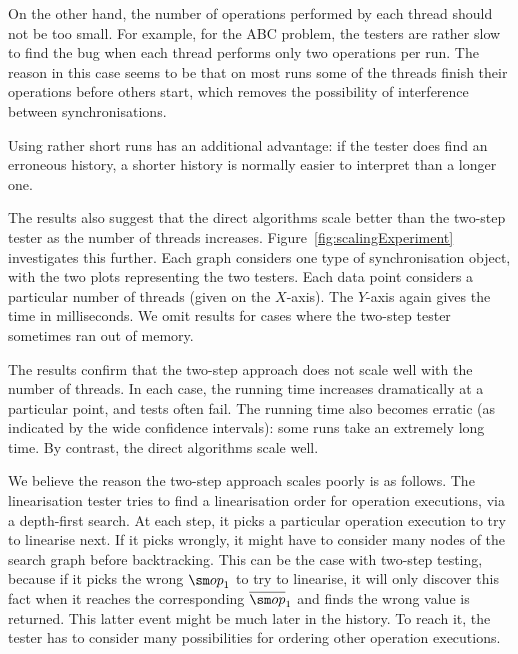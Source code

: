 On the other hand, the number of operations performed by each thread should
not be too small.  For example, for the ABC problem, the testers are rather
slow to find the bug when each thread performs only two operations per run.
The reason in this case seems to be that on most runs some of the threads
finish their operations before others start, which removes the possibility of
interference between synchronisations.

Using rather short runs has an additional advantage: if the tester does find
an erroneous history, a shorter history is normally easier to interpret than a
longer one.  



The results also suggest that the direct algorithms scale better than the
two-step tester as the number of threads increases.
Figure~\ref{fig:scalingExperiment} investigates this further.  Each graph
considers one type of synchronisation object, with the two plots representing
the two testers.  Each data point considers a particular number of threads
(given on the $X$-axis).
The $Y$-axis again gives the time in milliseconds.  We omit results for cases
where the two-step tester sometimes ran out of memory.



%
The results confirm that the two-step approach does not scale well with the
number of threads.  In each case, the running time increases dramatically at a
particular point, and tests often fail.  The running time also becomes erratic
(as indicated by the wide confidence intervals): some runs take an extremely
long time.  By contrast, the direct algorithms scale well.

We believe the reason the two-step approach scales poorly is as follows.  The
linearisation tester tries to find a linearisation order for operation
executions, via a depth-first search.  At each step, it picks a particular
operation execution to try to linearise next.  If it picks wrongly, it might
have to consider many nodes of the search graph before backtracking.  This can
be the case with two-step testing, because if it picks the wrong $\op_1$ to try
to linearise, it will only discover this fact when it reaches the
corresponding $\overline{\op}_1$ and finds the wrong value is returned.  This
latter event might be much later in the history.  To reach it, the tester has
to consider many possibilities for ordering other operation executions.

